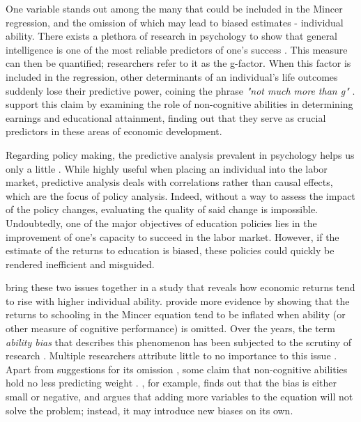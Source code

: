 One variable stands out among the many that could be included in the Mincer regression, and the omission of which may lead to biased estimates - individual ability. There exists a plethora of research in psychology to show that general intelligence is one of the most reliable predictors of one's success \citep{gottfredson1997g, deary2007intelligence, deary2020intelligence, ozawa2022educational}. This measure can then be quantified; researchers refer to it as the g-factor. When this factor is included in the regression, other determinants of an individual's life outcomes suddenly lose their predictive power, coining the phrase \textit{"not much more than g"} \citep{ree1994predicting}. \cite{heckman2001importance} support this claim by examining the role of non-cognitive abilities in determining earnings and educational attainment, finding out that they serve as crucial predictors in these areas of economic development.

Regarding policy making, the predictive analysis prevalent in psychology helps us only a little \citep{almlund2011personality}. While highly useful when placing an individual into the labor market, predictive analysis deals with correlations rather than causal effects, which are the focus of policy analysis. Indeed, without a way to assess the impact of the policy changes, evaluating the quality of said change is impossible. Undoubtedly, one of the major objectives of education policies lies in the improvement of one's capacity to succeed in the labor market. However, if the estimate of the returns to education is biased, these policies could quickly be rendered inefficient and misguided.

\cite{herrnstein2010bell} bring these two issues together in a study that reveals how economic returns tend to rise with higher individual ability. \cite{bowles2001determinants} provide more evidence by showing that the returns to schooling in the Mincer equation tend to be inflated when ability (or other measure of cognitive performance) is omitted. Over the years, the term \textit{ability bias} that describes this phenomenon has been subjected to the scrutiny of research \citep{heckman2001identifying}. Multiple researchers attribute little to no importance to this issue \citep{ashenfelter1999schooling}. Apart from suggestions for its omission \citep{blackburn1993ols}, some claim that non-cognitive abilities hold no less predicting weight \citep{heckman2001importance}. \cite{griliches1977estimating}, for example, finds out that the bias is either small or negative, and \cite{patrinos2016estimating} argues that adding more variables to the equation will not solve the problem; instead, it may introduce new biases on its own.

